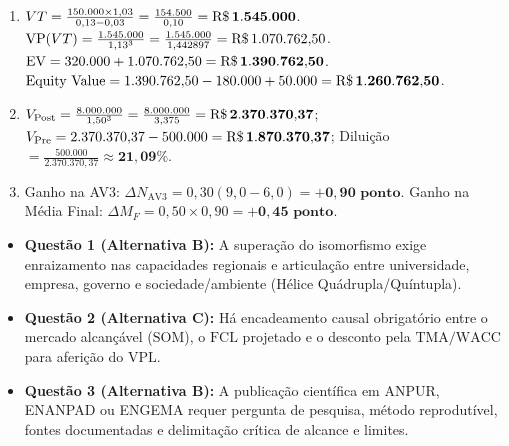 \begin{boxGabarito}
\begin{enumerate}[leftmargin=1.5em, itemsep=4pt]
  \item $VT = \frac{150.000 \times 1{,}03}{0{,}13 - 0{,}03} = \frac{154.500}{0{,}10} = \mathbf{\text{R\$\,}{1.545.000}}$. $\text{VP}(VT) = \frac{1.545.000}{1{,}13^3} = \frac{1.545.000}{1{,}442897} = \text{R\$\,}{1.070.762{,}50}$. $\text{EV} = 320.000 + 1.070.762{,}50 = \mathbf{\text{R\$\,}{1.390.762{,}50}}$. $\text{Equity Value} = 1.390.762{,}50 - 180.000 + 50.000 = \mathbf{\text{R\$\,}{1.260.762{,}50}}$.
  \item $V_{\text{Post}} = \frac{8.000.000}{1{,}50^3} = \frac{8.000.000}{3{,}375} = \mathbf{\text{R\$\,}{2.370.370{,}37}}$; $V_{\text{Pre}} = 2.370.370{,}37 - 500.000 = \mathbf{\text{R\$\,}{1.870.370{,}37}}$; Diluição $= \frac{500.000}{2.370.370{,}37} \approx \mathbf{21{,}09\%}$.
  \item Ganho na AV3: $\Delta N_{\text{AV3}} = 0{,}30(9{,}0 - 6{,}0) = \mathbf{+0{,}90\text{ ponto}}$. Ganho na Média Final: $\Delta M_F = 0{,}50 \times 0{,}90 = \mathbf{+0{,}45\text{ ponto}}$.
\end{enumerate}
\end{boxGabarito}

\begin{boxGabarito}
\begin{itemize}[leftmargin=1.4em, itemsep=3pt]
  \item \textbf{Questão 1 (Alternativa B):} A superação do isomorfismo exige enraizamento nas capacidades regionais e articulação entre universidade, empresa, governo e sociedade/ambiente (Hélice Quádrupla/Quíntupla).
  \item \textbf{Questão 2 (Alternativa C):} Há encadeamento causal obrigatório entre o mercado alcançável ($\text{SOM}$), o $\text{FCL}$ projetado e o desconto pela $\text{TMA}/\text{WACC}$ para aferição do $\text{VPL}$.
  \item \textbf{Questão 3 (Alternativa B):} A publicação científica em ANPUR, ENANPAD ou ENGEMA requer pergunta de pesquisa, método reprodutível, fontes documentadas e delimitação crítica de alcance e limites.
\end{itemize}
\end{boxGabarito}


